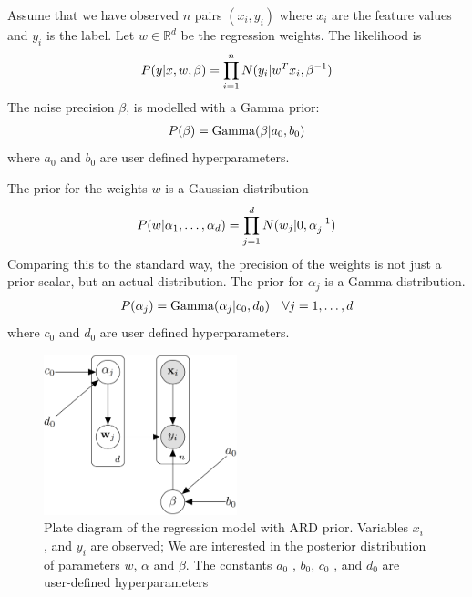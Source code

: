 \documentclass[12pt]{article}
\begin{document}
    \vspace{5mm}
    Assume that we have observed $n$ pairs $(x_i, y_i)$ where $x_i$ are the feature values and $y_i$ is the label. Let $w \in \mathbb{R}^d$ be the regression weights. The likelihood is
    \begin{align}
        P(y|x,w,\beta) = \prodlim{1}{n} N(y_i|w^Tx_i,\beta^{-1}) \label{eq:likelihood}
    \end{align}
    The noise precision $\beta$, is modelled with a Gamma prior:
    \begin{align}
        P(\beta) = \opGamma(\beta|a_0,b_0) \label{eq:betaprior}
    \end{align}
    where $a_0$ and $b_0$ are user defined hyperparameters.

    The prior for the weights $w$ is a Gaussian distribution
    \begin{align}
        P(w|\alpha_1, \ldots, \alpha_d) = \prodlim[j]{1}{d} N(w_j|0,\alpha_j^{-1}) \label{eq:wprior}
    \end{align}
    Comparing this to the standard way, the precision of the weights is not just a prior scalar, but an actual distribution. The prior for $\alpha_j$ is a Gamma distribution.
    \begin{align}
        P(\alpha_j) = \opGamma(\alpha_j|c_0,d_0) \quad \forall j = 1, \ldots, d \label{eq:alphaprior}
    \end{align}
    where $c_0$ and $d_0$ are user defined hyperparameters.

    \begin{figure}[H]
        \centering
        \includegraphics[width=0.5\textwidth]{bn_network.png}
        \caption{Plate diagram of the regression model with ARD prior. Variables $x_i$ , and $y_i$ are observed; We are interested in the posterior distribution of parameters $w$, $\alpha$ and $\beta$. The constants $a_0$ , $b_0$, $c_0$ , and $d_0$ are user-defined hyperparameters}
        \label{fig:diagram}
    \end{figure}
\end{document}

